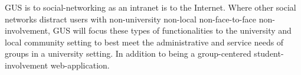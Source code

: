 GUS is to social-networking as an intranet is to the Internet.
		Where other social networks distract users with non-university
		non-local non-face-to-face non-involvement, GUS will focus these
		types of functionalities to the university and local community
		setting to best meet the administrative and service needs of groups
		in a university setting.  In addition to being a group-centered
		student-involvement web-application.